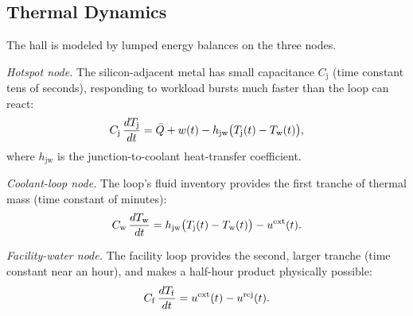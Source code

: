 \vspace{-3mm}
\subsection{Thermal Dynamics}
\label{subsec:dynamics}

The hall is modeled by lumped energy balances on the three nodes.

\emph{Hotspot node.} The silicon-adjacent metal has small capacitance
$C_\mathrm{j}$ (time constant tens of seconds), responding to workload bursts
much faster than the loop can react:
\begin{equation}
C_\mathrm{j}\,\frac{d\Tj}{dt} = \bar Q + w(t)
 - h_{\mathrm{jw}}\bigl(\Tj(t)-\Tw(t)\bigr),
\label{eq:chip}
\end{equation}
where $h_{\mathrm{jw}}$ is the junction-to-coolant heat-transfer coefficient.

\emph{Coolant-loop node.} The loop's fluid inventory provides the first
tranche of thermal mass (time constant of minutes):
\begin{equation}
C_\mathrm{w}\,\frac{d\Tw}{dt} = h_{\mathrm{jw}}\bigl(\Tj(t)-\Tw(t)\bigr)
 - \uext(t).
\label{eq:loop}
\end{equation}

\emph{Facility-water node.} The facility loop provides the second, larger
tranche (time constant near an hour), and makes a half-hour product
physically possible:
\begin{equation}
C_\mathrm{f}\,\frac{d\Tf}{dt} = \uext(t) - \urej(t).
\label{eq:facility}
\end{equation}

